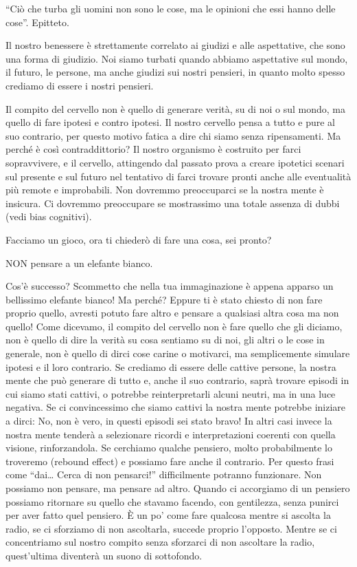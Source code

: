 \documentclass[12pt]{book} %
\begin{document}
“Ciò che turba gli uomini non sono le cose, ma le opinioni che essi hanno delle cose”. Epitteto.

Il nostro benessere è strettamente correlato ai giudizi e alle aspettative, che sono una forma di giudizio. Noi siamo
turbati quando abbiamo aspettative sul mondo, il futuro, le persone, ma anche giudizi sui nostri pensieri, in quanto molto spesso crediamo di essere i nostri pensieri.

Il compito del cervello non è quello di generare verità, su di noi o sul mondo, ma quello di fare ipotesi e contro
ipotesi. Il nostro cervello pensa a tutto e pure al suo contrario, per questo motivo fatica a dire chi siamo senza ripensamenti. Ma perché
è così contraddittorio? Il nostro organismo è costruito per farci sopravvivere, e il cervello, attingendo dal
passato prova a creare ipotetici scenari sul presente e sul futuro nel tentativo di farci trovare pronti anche alle
eventualità più remote e improbabili. Non dovremmo preoccuparci se la nostra mente è insicura. Ci
dovremmo preoccupare se mostrassimo una totale assenza di dubbi (vedi bias cognitivi).

Facciamo un gioco, ora ti chiederò di fare una cosa, sei pronto?

NON pensare a un elefante bianco. 

Cos'è successo? Scommetto che nella tua immaginazione è appena apparso un bellissimo elefante
bianco! Ma perché? Eppure ti è stato chiesto di non fare proprio quello, avresti potuto fare altro e pensare a
qualsiasi altra cosa ma non quello! Come dicevamo, il compito del cervello non è fare quello che gli diciamo, non è
quello di dire la verità su cosa sentiamo su di noi, gli altri o le cose in generale, non è quello di dirci cose carine
o motivarci, ma semplicemente simulare ipotesi e il loro contrario. Se crediamo di essere delle cattive persone, la
nostra mente che può generare di tutto e, anche il suo contrario, saprà trovare episodi in cui siamo stati cattivi, o
potrebbe reinterpretarli alcuni neutri, ma in una luce negativa. Se ci convincessimo che siamo cattivi la nostra
mente potrebbe iniziare a dirci: No, non è vero, in questi episodi sei stato bravo! In altri casi invece la nostra mente tenderà a selezionare ricordi e interpretazioni coerenti con quella visione, rinforzandola. Se cerchiamo qualche pensiero,
molto probabilmente lo troveremo (rebound effect) e possiamo fare anche il contrario. Per questo frasi come “dai… Cerca di
non pensarci!” difficilmente potranno funzionare. Non possiamo non pensare, ma pensare ad altro. Quando ci accorgiamo di un pensiero
possiamo ritornare su quello che stavamo facendo, con gentilezza, senza punirci per aver fatto quel pensiero. È un
po' come fare qualcosa mentre si ascolta la radio, se ci sforziamo di non ascoltarla, succede
proprio l'opposto. Mentre se ci concentriamo sul nostro compito senza sforzarci di non ascoltare
la radio, quest'ultima diventerà un suono di sottofondo.
\end{document}
